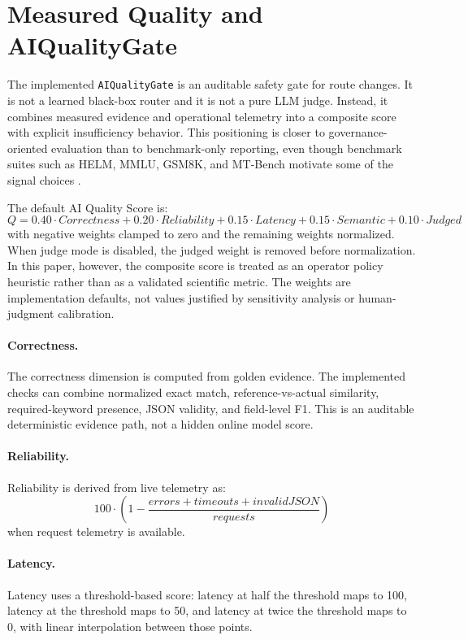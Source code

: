 \section{Measured Quality and AIQualityGate}
The implemented \texttt{AIQualityGate} is an auditable safety gate for route
changes. It is not a learned black-box router and it is not a pure LLM judge.
Instead, it combines measured evidence and operational telemetry into a
composite score with explicit insufficiency behavior. This positioning is
closer to governance-oriented evaluation than to benchmark-only reporting, even
though benchmark suites such as HELM, MMLU, GSM8K, and MT-Bench motivate some
of the signal choices \cite{liang2022helm,hendrycks2020mmlu,cobbe2021gsm8k,zheng2023mtbench}.

The default AI Quality Score is:
\[
Q = 0.40 \cdot Correctness +
    0.20 \cdot Reliability +
    0.15 \cdot Latency +
    0.15 \cdot Semantic +
    0.10 \cdot Judged
\]
with negative weights clamped to zero and the remaining weights normalized.
When judge mode is disabled, the judged weight is removed before
normalization. In this paper, however, the composite score is treated as an
operator policy heuristic rather than as a validated scientific metric. The
weights are implementation defaults, not values justified by sensitivity
analysis or human-judgment calibration.

\paragraph{Correctness.}
The correctness dimension is computed from golden evidence. The implemented
checks can combine normalized exact match, reference-vs-actual similarity,
required-keyword presence, JSON validity, and field-level F1. This is an
auditable deterministic evidence path, not a hidden online model score.

\paragraph{Reliability.}
Reliability is derived from live telemetry as:
\[
100 \cdot \left(1 - \frac{errors + timeouts + invalidJSON}{requests}\right)
\]
when request telemetry is available.

\paragraph{Latency.}
Latency uses a threshold-based score: latency at half the threshold maps to
100, latency at the threshold maps to 50, and latency at twice the threshold
maps to 0, with linear interpolation between those points.


